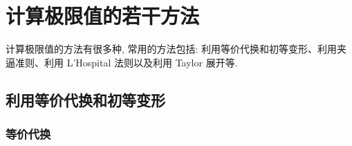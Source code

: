 \section{计算极限值的若干方法}

计算极限值的方法有很多种, 常用的方法包括: 利用等价代换和初等变形、利用夹逼准则、利用 L'Hospital 法则以及利用 Taylor 展开等.

\subsection{利用等价代换和初等变形}

\subsubsection{等价代换}



